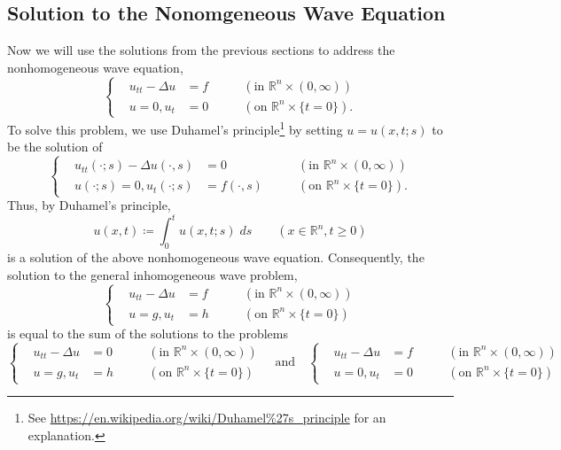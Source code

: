 \documentclass{article}
\numberwithin{equation}{section}
\begin{document}
	\subsection{Solution to the Nonomgeneous Wave Equation}
	Now we will use the solutions from the previous sections to address the nonhomogeneous wave equation, 
	\begin{equation}
		\left\{
		\begin{alignedat}{3}
			&u_{tt} - \Delta u &= f &\qquad (\text{in $\mathbb{R}^{n} \times (0,\infty)$}) \\
			&u =0, u_{t} &= 0 &\qquad (\text{on $\mathbb{R}^{n} \times \{t = 0\}$}). 
		\end{alignedat}
		\right.
	\end{equation}
	To solve this problem, we use Duhamel's principle\footnote{See \href{https://en.wikipedia.org/wiki/Duhamel\%27s\_principle}{https://en.wikipedia.org/wiki/Duhamel\%27s\_principle} for an explanation.} by setting $u = u(x,t;s)$ to be the solution of 
	\begin{equation}
		\left\{
		\begin{alignedat}{3}
			&u_{tt}(\cdot; s)- \Delta u(\cdot, s) &= 0 \qquad &(\text{in $\mathbb{R}^{n} \times (0,\infty)$}) \\
			&u(\cdot;s) =0, u_{t}(\cdot;s) &= f(\cdot,s) \qquad &(\text{on $\mathbb{R}^{n} \times \{t = 0\}$}). 
		\end{alignedat}
		\right.
	\end{equation}
	Thus, by Duhamel's principle, 
	\begin{equation}
		u(x, t) \coloneqq \int_{0}^{t}u(x,t;s)\;ds \qquad (x \in \mathbb{R}^n, t \geq 0)
	\end{equation}
	is a solution of the above nonhomogeneous wave equation. Consequently, the solution to the general inhomogeneous wave problem, 
	\begin{equation}
		\left\{
		\begin{alignedat}{3}
			&u_{tt} - \Delta u &= f &\qquad(\text{in $\mathbb{R}^n \times (0,\infty)$}) \\
			&u = g, u_t &=h &\qquad (\text{on $\mathbb{R}^n \times \{t = 0\}$})
		\end{alignedat}
		\right.
	\end{equation}
	is equal to the sum of the solutions to the problems
	\begin{equation}
		\left\{
		\begin{alignedat}{3}
			&u_{tt} - \Delta u &= 0 &\qquad(\text{in $\mathbb{R}^n \times (0,\infty)$}) \\
			&u = g, u_t &=h &\qquad (\text{on $\mathbb{R}^n \times \{t = 0\}$})
		\end{alignedat}
		\right.
		\quad 
		\text{and} 
		\quad 
		\left\{
		\begin{alignedat}{3}
			&u_{tt} - \Delta u &= f &\qquad(\text{in $\mathbb{R}^n \times (0,\infty)$}) \\
			&u = 0, u_t &=0 &\qquad (\text{on $\mathbb{R}^n \times \{t = 0\}$})
		\end{alignedat}
		\right.
	\end{equation}
	
\end{document}
